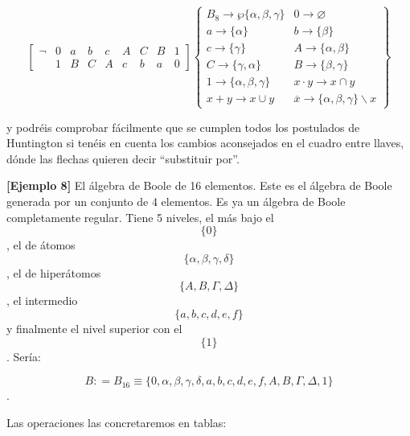   \[\begin{bmatrix}
  \neg & 0 & a & b & c & A & C & B & 1 \\
   & 1 & B & C & A & c & b & a & 0
  \end{bmatrix}\begin{Bmatrix}
  {{B_{8}\rightarrow\wp}{\{{\alpha,\beta,\gamma}\}}} & {0\rightarrow\varnothing} \\
  {a\rightarrow{\{\alpha\}}} & {b\rightarrow{\{\beta\}}} \\
  {c\rightarrow{\{\gamma\}}} & {A\rightarrow{\{{\alpha,\beta}\}}} \\
  {C\rightarrow{\{{\gamma,\alpha}\}}} & {B\rightarrow{\{{\beta,\gamma}\}}} \\
  {1\rightarrow{\{{\alpha,\beta,\gamma}\}}} & {{x \cdot y}\rightarrow{x \cap y}} \\
  {{x + y}\rightarrow{x \cup y}} & {\overline{x}\rightarrow{{\{{\alpha,\beta,\gamma}\}} \smallsetminus x}}
  \end{Bmatrix}\]

  y podréis comprobar fácilmente que se cumplen todos los postulados de
  Huntington si te\-néis en cuenta los cambios aconsejados en el cuadro
  entre llaves, dónde las flechas quieren decir ``substituir por''.

  \textbf{{[}Ejemplo 8{]}} El álgebra de Boole de 16 elementos. Este es
  el álgebra de Boole generada por un conjunto de 4 elementos. Es ya un
  álgebra de Boole completamente regular. Tiene 5 niveles, el más bajo
  el \[\{ 0\}\], el de átomos \[\{{\alpha,\beta,\gamma,\delta}\}\], el
  de hiperátomos \[\{{A,B,\Gamma,\Delta}\}\], el intermedio
  \[\{{a,b,c,d,e,f}\}\]y finalmente el nivel superior con el \[\{ 1\}\].
  Sería:

  \[B{{: = B_{16}} \equiv {\{{0,\alpha,\beta,\gamma,\delta,a,b,c,d,e,f,A,B,\Gamma,\Delta,1}\}}}\].

  Las operaciones las concretaremos en tablas:

  \setcounter{MaxMatrixCols}{20}
  \setlength{\arraycolsep}{8pt} %
  
